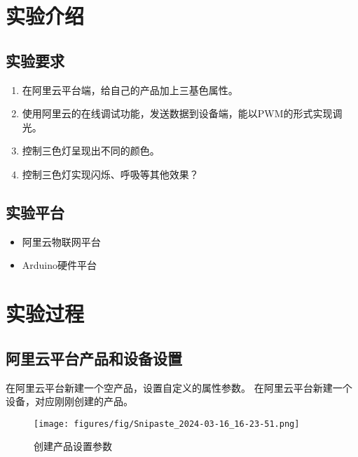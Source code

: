 \documentclass[12pt,hyperref,a4paper,UTF8]{ctexart}
\begin{document}
\cover

%
%

\thispagestyle{empty} %

\newpage
\tableofcontents

\newpage


\section{实验介绍}
\subsection{实验要求}

\begin{enumerate}[itemsep=-5pt, topsep=0pt, partopsep=0pt]
    \item 在阿里云平台端，给自己的产品加上三基色属性。
    \item 使用阿里云的在线调试功能，发送数据到设备端，能以PWM的形式实现调光。
    \item 控制三色灯呈现出不同的颜色。
    \item 控制三色灯实现闪烁、呼吸等其他效果？
\end{enumerate}
\subsection{实验平台}
\begin{itemize}[itemsep=-5pt, topsep=0pt, partopsep=0pt]
    \item 阿里云物联网平台
    \item Arduino硬件平台
\end{itemize}


\section{实验过程}
\subsection*{阿里云平台产品和设备设置}
    在阿里云平台新建一个空产品，设置自定义的属性参数。
    在阿里云平台新建一个设备，对应刚刚创建的产品。
    \begin{figure}[H]
        \centering
        \texttt{[image: figures/fig/Snipaste\_2024-03-16\_16-23-51.png]}
        \caption{创建产品设置参数}
        \label{fig:enter-label}
    \end{figure}
\end{document}
